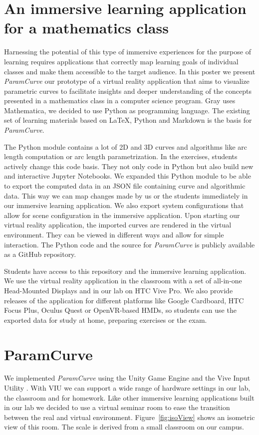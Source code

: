 \documentclass{VRARWorkshop}
\begin{document}
\section{An immersive learning application for a mathematics class}
Harnessing the potential of this type of immersive experiences for the purpose of learning requires applications that correctly map learning goals of individual classes and make them accessible to the target audience.
In this poster we present \textit{ParamCurve} our prototype of a virtual reality application that aims to visualize parametric curves to facilitate insights and deeper understanding of the concepts presented in a mathematics class in a computer science program.
Gray \cite{gray_06} uses Mathematica, we decided to use Python as programming language.
The existing set of learning materials based on \LaTeX{}, Python and Markdown is the basis for \textit{ParamCurve}.

The Python module contains a lot of 2D and 3D curves and algorithms like arc length computation or arc length parametrization.
In the exercises, students actively change this code basis. They not only code in Python but also build new and interactive Jupyter Notebooks.
We expanded this Python module to be able to export the computed data in an JSON file containing
curve and algorithmic data.
This way we can map changes made by us or the students immediately in our immersive  learning application.
We also export system configurations that allow for scene configuration in the immersive application.
Upon starting our virtual reality application, the imported curves are rendered in the virtual environment.
They can be viewed in different ways and allow for simple interaction.
The Python code and the source for \textit{ParamCurve} is publicly available as a GitHub repository.%

Students have access to this repository and the immersive learning application.
We use the virtual reality application in the classroom with a set of all-in-one Head-Mounted Displays
and in our lab on HTC Vive Pro.
We also provide releases of the application for different platforms like Google Cardboard, HTC Focus Plus,
Oculus Quest or OpenVR-based HMDs, so students can use the exported data for study at home, preparing
exercises or the exam.

\section{ParamCurve}
We implemented \textit{ParamCurve} using the Unity Game Engine and the Vive Input Utility \cite{viu}.
With VIU we can support a wide range of hardware settings in our lab, the classroom and for homework.
Like other immersive learning applications built in our lab we decided to use a virtual seminar room to ease the transition between the real and virtual environment.
Figure~\ref{fig:isoView} shows an isometric view of this room.
The scale is derived from a small classroom on our campus.
\end{document}

